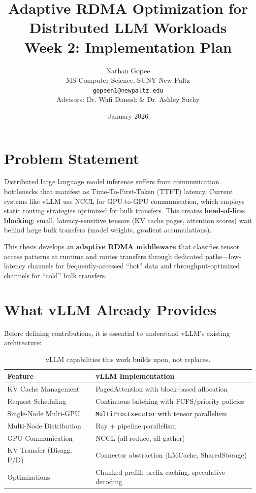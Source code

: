 \documentclass[10pt,letterpaper]{article}
\title{\textbf{Adaptive RDMA Optimization for Distributed LLM Workloads}\\[0.5em]
\large Week 2: Implementation Plan}
\author{Nathan Gopee\\
MS Computer Science, SUNY New Paltz\\
\texttt{gopeen1@newpaltz.edu}\\[1em]
\small Advisors: Dr. Wafi Danesh \& Dr. Ashley Suchy}
\date{January 2026}
\begin{document}
\maketitle

\section{Problem Statement}

Distributed large language model inference suffers from communication bottlenecks that manifest as Time-To-First-Token (TTFT) latency. Current systems like vLLM use NCCL for GPU-to-GPU communication, which employs static routing strategies optimized for bulk transfers. This creates \textbf{head-of-line blocking}: small, latency-sensitive tensors (KV cache pages, attention scores) wait behind large bulk transfers (model weights, gradient accumulations).

This thesis develops an \textbf{adaptive RDMA middleware} that classifies tensor access patterns at runtime and routes transfers through dedicated paths---low-latency channels for frequently-accessed ``hot'' data and throughput-optimized channels for ``cold'' bulk transfers.

\section{What vLLM Already Provides}

Before defining contributions, it is essential to understand vLLM's existing architecture:

\begin{table}[h]
\centering
\small
\begin{tabular}{@{}ll@{}}
\toprule
\textbf{Feature} & \textbf{vLLM Implementation} \\
\midrule
KV Cache Management & PagedAttention with block-based allocation \\
Request Scheduling & Continuous batching with FCFS/priority policies \\
Single-Node Multi-GPU & \texttt{MultiProcExecutor} with tensor parallelism \\
Multi-Node Distribution & Ray + pipeline parallelism \\
GPU Communication & NCCL (all-reduce, all-gather) \\
KV Transfer (Disagg. P/D) & Connector abstraction (LMCache, SharedStorage) \\
Optimizations & Chunked prefill, prefix caching, speculative decoding \\
\bottomrule
\end{tabular}
\caption{vLLM capabilities this work builds upon, not replaces.}
\end{table}
\end{document}
